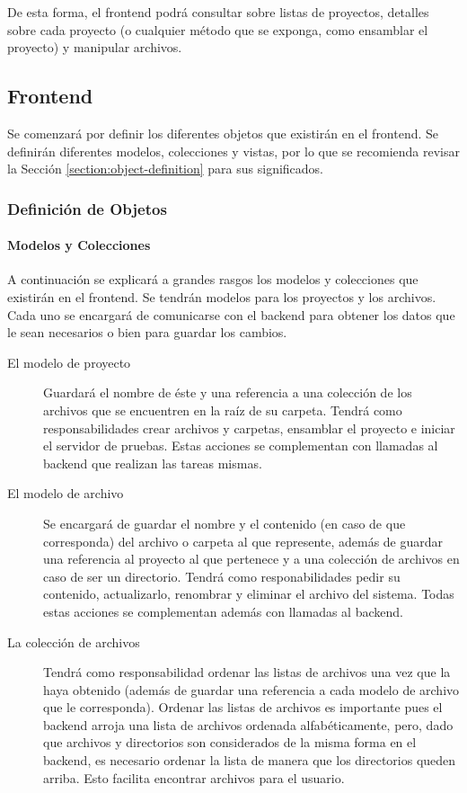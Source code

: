 \documentclass[12pt,spanish,letter]{report}
\begin{document}
De esta forma, el frontend podrá consultar sobre listas de proyectos,
detalles sobre cada proyecto (o cualquier método que se exponga, como
ensamblar el proyecto) y manipular archivos.

\subsection{Frontend}

Se comenzará por definir los diferentes objetos que existirán en el
frontend. Se definirán diferentes modelos, colecciones y vistas, por lo
que se recomienda revisar la Sección \ref{section:object-definition}
para sus significados.

\subsubsection{Definición de Objetos}

\paragraph{Modelos y Colecciones}

A continuación se explicará a grandes rasgos los modelos y colecciones
que existirán en el frontend. Se tendrán modelos para los proyectos y
los archivos. Cada uno se encargará de comunicarse con el backend para
obtener los datos que le sean necesarios o bien para guardar los
cambios.

\begin{description}
\item[El modelo de proyecto]
Guardará el nombre de éste y una referencia a una colección de los
archivos que se encuentren en la raíz de su carpeta. Tendrá como
responsabilidades crear archivos y carpetas, ensamblar el proyecto e
iniciar el servidor de pruebas. Estas acciones se complementan con
llamadas al backend que realizan las tareas mismas.
\item[El modelo de archivo]
Se encargará de guardar el nombre y el contenido (en caso de que
corresponda) del archivo o carpeta al que represente, además de guardar
una referencia al proyecto al que pertenece y a una colección de
archivos en caso de ser un directorio. Tendrá como responabilidades
pedir su contenido, actualizarlo, renombrar y eliminar el archivo del
sistema. Todas estas acciones se complementan además con llamadas al
backend.
\item[La colección de archivos]
Tendrá como responsabilidad ordenar las listas de archivos una vez que
la haya obtenido (además de guardar una referencia a cada modelo de
archivo que le corresponda). Ordenar las listas de archivos es
importante pues el backend arroja una lista de archivos ordenada
alfabéticamente, pero, dado que archivos y directorios son considerados
de la misma forma en el backend, es necesario ordenar la lista de manera
que los directorios queden arriba. Esto facilita encontrar archivos para
el usuario.
\end{description}
\end{document}
